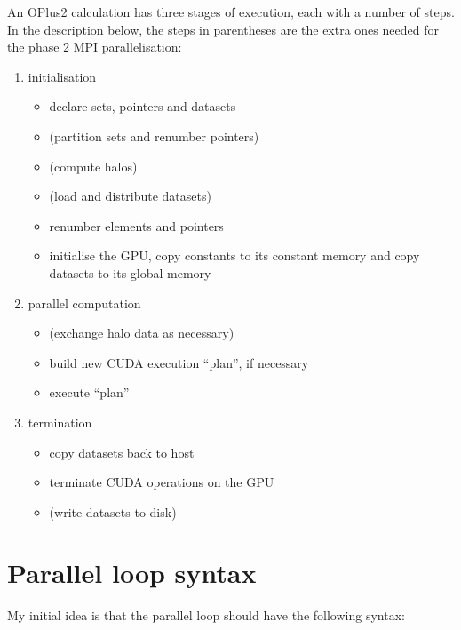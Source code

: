 \documentclass[12pt]{article}
\begin{document}
An OPlus2 calculation has three stages of execution, each with a 
number of steps.  In the description below, the steps in parentheses 
are the extra ones needed for the phase 2 MPI parallelisation:
\begin{enumerate}
\item
initialisation
 \begin{itemize}
 \item
 declare sets, pointers and datasets
 \item
 (partition sets and renumber pointers)
 \item
 (compute halos)
 \item
 (load and distribute datasets)
 \item
 renumber elements and pointers
 \item
 initialise the GPU, copy constants to its constant memory 
 and copy datasets to its global memory
 \end{itemize}

\item
parallel computation
 \begin{itemize}
 \item
 (exchange halo data as necessary)
 \item
 build new CUDA execution ``plan'', if necessary 
 \item
 execute ``plan''
 \end{itemize}


\item
termination
 \begin{itemize}
 \item
 copy datasets back to host
 \item
 terminate CUDA operations on the GPU
 \item
 (write datasets to disk)
 \end{itemize}
\end{enumerate}


\newpage

\section{Parallel loop syntax}

My initial idea is that the parallel loop should have the following syntax:
\end{document}
